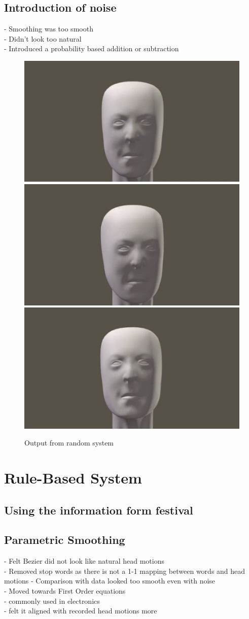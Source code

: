 \documentclass[bsc,frontabs,twoside,singlespacing,parskip]{infthesis}
\begin{document}
\subsection{Introduction of noise}
- Smoothing was too smooth\\
- Didn't look too natural \\
- Introduced a probability based addition or subtraction\\

\begin{figure}
	\centering
	\includegraphics[width=.5\textwidth]{fightclub1.png}
	\includegraphics[width=.5\textwidth]{fightclub3.png}
	\includegraphics[width=.5\textwidth]{fightclub4.png}
	\caption{Output from random system}
\end{figure}

\section{Rule-Based System}

\subsection{Using the information form festival}

\subsection{Parametric Smoothing}
- Felt Bezier did not look like natural head motions \\
- Removed stop words as there is not a 1-1 mapping between words and head motions
- Comparison with data looked too smooth even with noise \\
- Moved towards First Order equations \\
- commonly used in electronics \\
- felt it aligned with recorded head motions more\\
	
\end{document}
